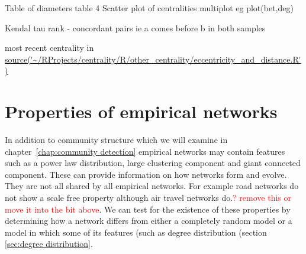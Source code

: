 Table of diameters \cite{crescenzi2013computing}
 table 4 
Scatter plot of centralities multiplot eg plot(bet,deg)

Kendal tau rank - concordant pairs ie a comes before b in both samples 

most recent centrality in \url{source('~/RProjects/centrality/R/other_centrality/eccentricity_and_distance.R')}


\section{Properties of empirical networks}
\label{sec:Properties of empirical networks}
In addition to community structure which we will examine in chapter~\ref{chap:community detection} empirical networks may contain features such as a power law distribution, large clustering component and giant connected component. These can provide information on how networks form and evolve. They are not all shared by all empirical networks. For example road networks do not show a scale free property although air travel networks do.\textcolor{red}{? remove this or move it into the bit above}. We can test for the existence of these properties by determining how a network differs from either a completely random model or a model in which some of its features (such as degree distribution (section \ref{sec:degree distribution}.



